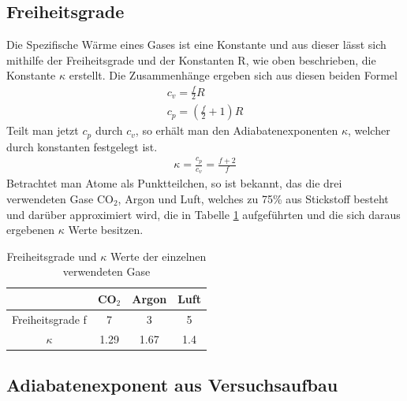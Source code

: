 \documentclass[12pt,a4paper,titlepage,headinclude,bibtotoc]{scrartcl}
\begin{document}
\subsection{Freiheitsgrade}
Die Spezifische Wärme eines Gases ist eine Konstante und aus dieser lässt sich mithilfe der Freiheitsgrade und der Konstanten R, wie oben beschrieben, die Konstante $\kappa$ erstellt.
Die Zusammenhänge ergeben sich aus diesen beiden Formel \cite[S. 262]{gerthsen}
\begin{align}
	c_v=\frac{f}{2}R\\
	c_p=\left(\frac{f}{2}+1\right)R
\end{align}
Teilt man jetzt $c_p$ durch $c_v$, so erhält man den Adiabatenexponenten $\kappa$, welcher durch konstanten festgelegt ist.
\begin{align}
	\kappa=\frac{c_p}{c_v}=\frac{f+2}{f}
\end{align}
Betrachtet man Atome als Punktteilchen, so ist bekannt, das die drei verwendeten Gase CO$_2$, Argon und Luft, welches zu 75\% aus Stickstoff besteht und darüber approximiert wird, die in Tabelle \ref{tab:kappafrei} aufgeführten und die sich daraus ergebenen $\kappa$ Werte besitzen.
\begin{table}[!h]
\centering
\begin{tabular}{|c|c|c|c|}
	\hline
				& CO$_2$	& Argon		& Luft\\
	\hline\hline
	Freiheitsgrade f	& 7		& 3		& 5\\
	$\kappa$		& 1.29		& 1.67		& 1.4\\
	\hline
\end{tabular}
\caption{Freiheitsgrade und $\kappa$ Werte der einzelnen verwendeten Gase}
\label{tab:kappafrei}
\end{table}

\subsection{Adiabatenexponent aus Versuchsaufbau}
\end{document}
